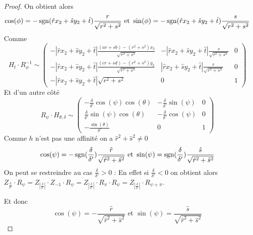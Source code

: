 \begin{proof}
 On obtient alors 
 \begin{equation*}
 \cos( \phi )= -\operatorname{sgn}(\hat r x_2 +\hat s y_2 +\hat t) \frac{r}{\sqrt{r^2 + s^2}} \text{ et } \sin( \phi )= -\operatorname{sgn}(\hat r x_2 +\hat s y_2 +\hat t) \frac{s}{\sqrt{r^2 + s^2}}
 \end{equation*}
 Comme 
 \begin{equation*}
H_t \cdot R_{\phi}^{-1} \sim
 \begin{pmatrix}
 -|\hat r x_2 +\hat s y_2 +\hat t|\frac{(ar+sb)-(r^2 + s^2)x_2}{\sqrt{r^2 + s^2}}&-|\hat r x_2 +\hat s y_2 +\hat t|\frac{\hat s}{\sqrt{r^2 + s^2}}&0\\
 -|\hat r x_2 +\hat s y_2 +\hat t|\frac{(cr+sd)-(r^2 + s^2)y_2}{\sqrt{r^2 + s^2}}&|\hat r x_2 +\hat s y_2 +\hat t|\frac{r}{\sqrt{r^2 + s^2}}&0\\
 -|\hat r x_2 +\hat s y_2 +\hat t|\sqrt{r^2 + s^2}&0&1
 \end{pmatrix}
 \end{equation*}
 Et d'un autre côté 
 \begin{equation*}
R_{\psi} \cdot H_{\theta,\delta}  \sim 
 \begin{pmatrix}
 -\frac{\delta}{\delta'}\cos(\psi)\cos(\theta)&
-\frac{\delta}{\delta'}\sin(\psi)&
0\\
\frac{\delta}{\delta'}\sin(\psi)\cos(\theta)&
-\frac{\delta}{\delta'}\cos(\psi)&
0\\
-\frac{\sin(\theta)}{\delta'}&
0&
1
 \end{pmatrix}
 \end{equation*}
Comme $h$ n'est pas une affinité on a $\hat r^2 + \hat s^2 \ne 0$ 
 \begin{equation*}
  \cos( \psi ) =- \operatorname{sgn}(\frac{\delta}{\delta'})\frac{\hat r}{\sqrt{\hat r^2 + \hat s^2}}\text{ et } \sin( \psi ) = \operatorname{sgn}(\frac{\delta}{\delta'})\frac{\hat s}{\sqrt{\hat r^2 + \hat s^2}}
 \end{equation*}
On peut se restreindre au cas $\frac{\delta}{\delta'}>0$ :
En effet si $\frac{\delta}{\delta'}<0$ on obtient alors $Z_{\frac{\delta}{\delta'}} \cdot R_{\psi}=Z_{\left|\frac{\delta}{\delta'}\right|}\cdot Z_{-1} \cdot R_{\psi}=Z_{\left|\frac{\delta}{\delta'}\right|}\cdot R_{\pi} \cdot R_{\psi}=Z_{\left|\frac{\delta}{\delta'}\right|}\cdot R_{\psi+\pi}$.


Et donc 
 \begin{equation*}
  \cos( \psi ) =- \frac{\hat r}{\sqrt{\hat r^2 + \hat s^2}} \text{ et } \sin( \psi ) = \frac{\hat s}{\sqrt{\hat r^2 + \hat s^2}}
 \end{equation*}




\end{proof}

